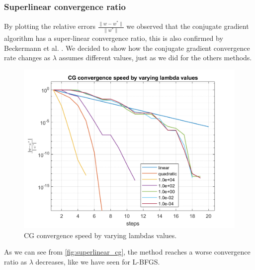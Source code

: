 \subsubsection{Superlinear convergence ratio}
By plotting the relative errors $\frac{\lVert w-w^*\rVert}{\lVert w^*\rVert}$ we observed that the conjugate gradient algorithm has a super-linear convergence ratio, this is also confirmed by Beckermann et al. \cite{beckermann2001superlinear}. We decided to show how the conjugate gradient convergence rate changes as $\lambda$ assumes different values, just as we did for the others methods.
\begin{figure}[H]
    \centering
    \includegraphics[width = 0.8\linewidth]{images/cg/superlinear_cg.png}
    \caption{CG convergence speed by varying lambdas values.}
    \label{fig:superlinear_cg}
\end{figure}

\noindent As we can see from \autoref{fig:superlinear_cg}, the method reaches a worse convergence ratio as $\lambda$ decreases, like we have seen for L-BFGS.

